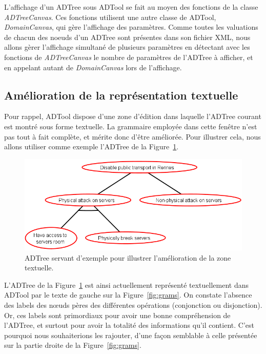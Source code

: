 		L'affichage d'un ADTree sous ADTool se fait au moyen des fonctions de la classe \emph{ADTreeCanvas}. Ces fonctions utilisent une autre classe de ADTool, \emph{DomainCanvas}, qui gère l'affichage des paramètres. Comme toutes les valuations de chacun des noeuds d'un ADTree sont présentes dans son fichier XML, nous allons gèrer l'affichage simultané de plusieurs paramètres en détectant avec les fonctions de \emph{ADTreeCanvas} le nombre de paramètres de l'ADTree à afficher, et en appelant autant de \emph{DomainCanvas} lors de l'affichage.
	
	\subsection{Amélioration de la représentation textuelle}

		Pour rappel, ADTool dispose d'une zone d'édition dans laquelle l'ADTree courant est montré sous forme textuelle. La grammaire employée dans cette fenêtre n'est pas tout à fait complète, et mérite donc d'être améliorée. Pour illustrer cela, nous allons utiliser comme exemple l'ADTree de la {\sc Figure}~\ref{fig:arbre_ex}.

		\begin{figure}[H]
	        \centering
	        \includegraphics[height=0.4\textwidth]{figure/tree.png}
	        \caption{ADTree servant d'exemple pour illustrer l'amélioration de la zone textuelle.}
	        \label{fig:arbre_ex}
	    \end{figure}

	    L'ADTree de la {\sc Figure}~\ref{fig:arbre_ex} est ainsi actuellement représenté textuellement dans ADTool par le texte de gauche sur la {\sc Figure}~\ref{fig:grams}. On constate l'absence des labels des nœuds pères des différentes opérations (conjonction ou disjonction). Or, ces labels sont primordiaux pour avoir une bonne compréhension de l'ADTree, et surtout pour avoir la totalité des informations qu'il contient. C'est pourquoi nous souhaiterions les rajouter, d'une façon semblable à celle présentée sur la partie droite de la {\sc Figure}~\ref{fig:grams}.

